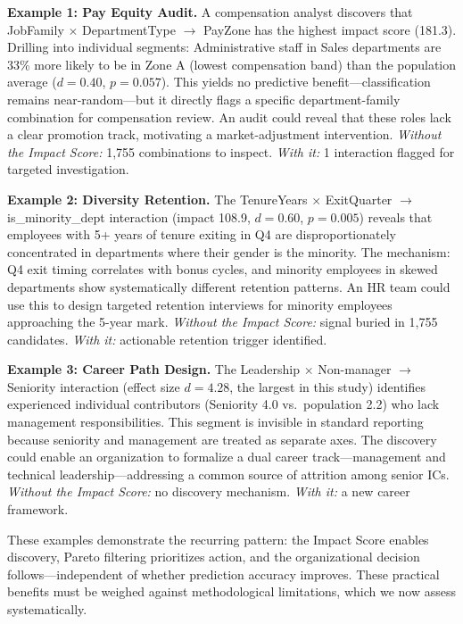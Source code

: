 \documentclass[conference]{IEEEtran}
\begin{document}
\textbf{Example 1: Pay Equity Audit.} A compensation analyst discovers that JobFamily $\times$ DepartmentType $\to$ PayZone has the highest impact score (181.3). Drilling into individual segments: Administrative staff in Sales departments are 33\% more likely to be in Zone A (lowest compensation band) than the population average ($d = 0.40$, $p = 0.057$). This yields no predictive benefit---classification remains near-random---but it directly flags a specific department-family combination for compensation review. An audit could reveal that these roles lack a clear promotion track, motivating a market-adjustment intervention. \textit{Without the Impact Score:} 1,755 combinations to inspect. \textit{With it:} 1 interaction flagged for targeted investigation.

\textbf{Example 2: Diversity Retention.} The TenureYears $\times$ ExitQuarter $\to$ is\_minority\_dept interaction (impact 108.9, $d = 0.60$, $p = 0.005$) reveals that employees with 5+ years of tenure exiting in Q4 are disproportionately concentrated in departments where their gender is the minority. The mechanism: Q4 exit timing correlates with bonus cycles, and minority employees in skewed departments show systematically different retention patterns. An HR team could use this to design targeted retention interviews for minority employees approaching the 5-year mark. \textit{Without the Impact Score:} signal buried in 1,755 candidates. \textit{With it:} actionable retention trigger identified.

\textbf{Example 3: Career Path Design.} The Leadership $\times$ Non-manager $\to$ Seniority interaction (effect size $d = 4.28$, the largest in this study) identifies experienced individual contributors (Seniority 4.0 vs.\ population 2.2) who lack management responsibilities. This segment is invisible in standard reporting because seniority and management are treated as separate axes. The discovery could enable an organization to formalize a dual career track---management and technical leadership---addressing a common source of attrition among senior ICs. \textit{Without the Impact Score:} no discovery mechanism. \textit{With it:} a new career framework.

These examples demonstrate the recurring pattern: the Impact Score enables discovery, Pareto filtering prioritizes action, and the organizational decision follows---independent of whether prediction accuracy improves. These practical benefits must be weighed against methodological limitations, which we now assess systematically.
\end{document}
